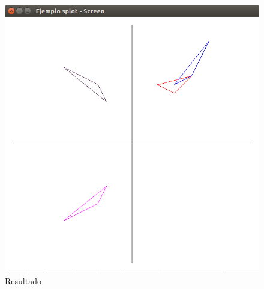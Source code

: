 \documentclass[a4paper,12pt]{article}
\begin{document}
\begin{enumerate}
  \begin{figure}[H]
   \centering
   \includegraphics[scale = 0.5]{6.png}
   \caption{Resultado}
  \end{figure}



 
\end{enumerate}
\end{document}
